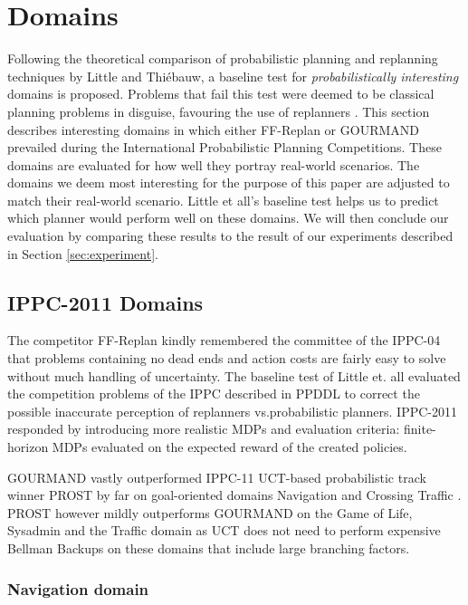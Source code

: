 \documentclass[runningheads,a4paper]{llncs}
\begin{document}
\section{Domains}
Following the theoretical comparison of probabilistic planning and replanning techniques by Little and Thi\'ebauw, a baseline test for \emph{probabilistically interesting} domains is proposed. Problems that fail this test were deemed to be classical planning problems in disguise, favouring the use of replanners \cite{little2007probvsreplan}. This section describes interesting domains in which either FF-Replan or GOURMAND prevailed during the International Probabilistic Planning Competitions. These domains are evaluated for how well they portray real-world scenarios. The domains we deem most interesting for the purpose of this paper are adjusted to match their real-world scenario. Little et all's baseline test helps us to predict which planner would perform well on these domains. We will then conclude our evaluation by comparing these results to the result of our experiments described in Section \ref{sec:experiment}.

\subsection{IPPC-2011 Domains}

The competitor FF-Replan \cite{FFReplan} kindly remembered the committee of the IPPC-04 that problems containing no dead ends and action costs are fairly easy to solve without much handling of uncertainty. The baseline test of Little et. all evaluated the competition problems of the IPPC described in PPDDL to correct the possible inaccurate perception of replanners vs.\@ probabilistic planners. IPPC-2011 responded by introducing more realistic MDPs and evaluation criteria: finite-horizon MDPs evaluated on the expected reward of the created policies.

GOURMAND vastly outperformed IPPC-11 UCT-based probabilistic track winner PROST by far on goal-oriented domains Navigation and Crossing Traffic \cite{kolobov2012gourmand}. PROST however mildly outperforms GOURMAND on the Game of Life, Sysadmin and the Traffic domain as UCT does not need to perform expensive Bellman Backups on these domains that include large branching factors.

\subsubsection{Navigation domain}
\end{document}
